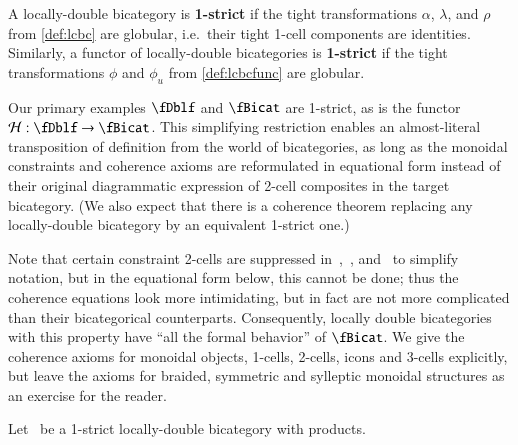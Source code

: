 \begin{defn}\label{defn:1strict}
  A locally-double bicategory is \textbf{1-strict} if the tight transformations $\alpha$, $\lambda$, and $\rho$ from \cref{def:lcbc} are globular, i.e.\ their tight 1-cell components are identities.
  Similarly, a functor of locally-double bicategories is \textbf{1-strict} if the tight transformations $\phi$ and $\phi_u$ from \cref{def:lcbcfunc} are globular.
\end{defn}

Our primary examples $\fDblf$ and $\fBicat$ are 1-strict, as is the functor $\cH:\fDblf\to\fBicat$.
This simplifying restriction enables an almost-literal transposition of definition from the world of bicategories, as long as the monoidal constraints and coherence axioms are reformulated in equational form instead of their original diagrammatic expression of 2-cell composites in the target bicategory.
(We also expect that there is a coherence theorem replacing any locally-double bicategory by an equivalent 1-strict one.)

Note that certain constraint 2-cells are suppressed in~\cite{nick:tricatsbook},~\cite{mccrudden:bal-coalgb}, and~\cite{gg:ldstr-tricat} to simplify notation, but in the equational form below, this cannot be done; thus the coherence equations look more intimidating, but in fact are not more complicated than their bicategorical counterparts. Consequently, locally double bicategories with this property have ``all the formal behavior'' of $\fBicat$.
We give the coherence axioms for monoidal objects, 1-cells, 2-cells, icons and 3-cells explicitly, but leave the axioms for braided, symmetric and sylleptic monoidal structures as an exercise for the reader.


Let \fB\ be a 1-strict locally-double bicategory with products.

